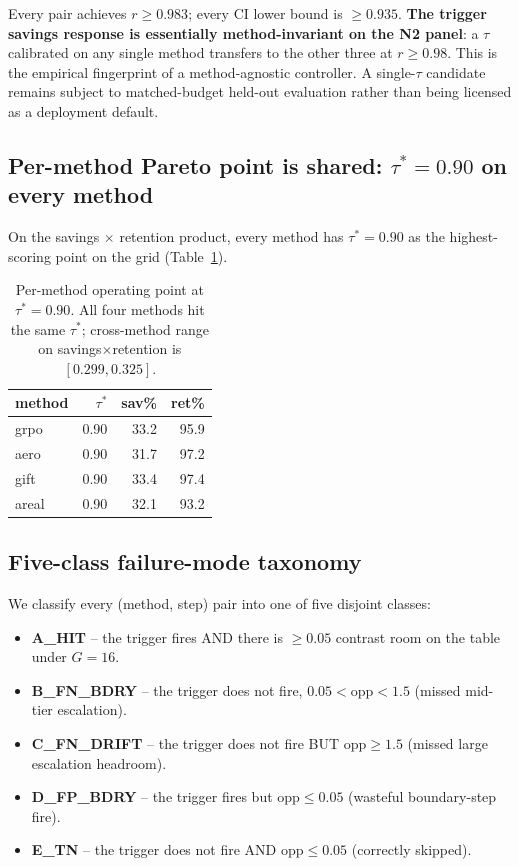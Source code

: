 Every pair achieves $r \ge 0.983$; every CI lower bound is $\ge 0.935$.
\textbf{The trigger savings response is essentially method-invariant on the
N2 panel}: a $\tau$ calibrated on any single method transfers to the other
three at $r \ge 0.98$.  This is the empirical fingerprint of a method-agnostic
controller.  A single-$\tau$ candidate remains subject to matched-budget
held-out evaluation rather than being licensed as a deployment default.

\subsection{Per-method Pareto point is shared: $\tau^*{=}0.90$ on every method}

On the savings $\times$ retention product, every method has
$\tau^*{=}0.90$ as the highest-scoring point on the grid
(Table~\ref{tab:p7-iter107-pareto}).

\begin{table}[t]
\centering\small
\caption{Per-method operating point at $\tau^*{=}0.90$.  All four methods
hit the same $\tau^*$; cross-method range on savings$\times$retention is
$[0.299, 0.325]$.}
\label{tab:p7-iter107-pareto}
\vspace{2pt}
\begin{tabular}{lrrr}
\toprule
method & $\tau^*$ & sav\% & ret\% \\
\midrule
grpo  & 0.90 & 33.2 & 95.9 \\
aero  & 0.90 & 31.7 & 97.2 \\
gift  & 0.90 & 33.4 & 97.4 \\
areal & 0.90 & 32.1 & 93.2 \\
\bottomrule
\end{tabular}
\end{table}

\subsection{Five-class failure-mode taxonomy}

We classify every (method, step) pair into one of five disjoint classes:

\begin{itemize}
\item \textbf{A\_HIT} -- the trigger fires AND there is $\ge 0.05$ contrast
room on the table under $G{=}16$.
\item \textbf{B\_FN\_BDRY} -- the trigger does not fire, $0.05 < \mathrm{opp} < 1.5$
(missed mid-tier escalation).
\item \textbf{C\_FN\_DRIFT} -- the trigger does not fire BUT $\mathrm{opp} \ge 1.5$
(missed large escalation headroom).
\item \textbf{D\_FP\_BDRY} -- the trigger fires but $\mathrm{opp} \le 0.05$
(wasteful boundary-step fire).
\item \textbf{E\_TN} -- the trigger does not fire AND $\mathrm{opp} \le 0.05$
(correctly skipped).
\end{itemize}

